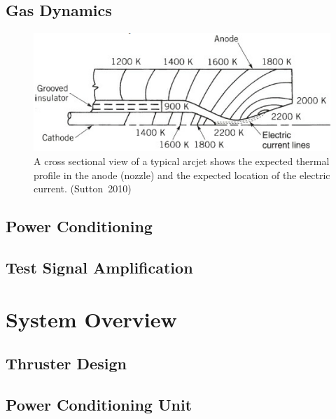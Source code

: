 \documentclass[journal]{IEEEtran}
\begin{document}
\subsection{Gas Dynamics}

\begin{figure}[hbp]
  \centering
  \includegraphics[width=\linewidth]{img/cross-section_sutton}
  \caption[Arcjet cross-section]{A cross sectional view of a typical arcjet shows the expected thermal profile in the anode (nozzle) and the expected location of the electric current. (Sutton~2010)
\label{fig:x-section-sutton}}
\end{figure}

\subsection{Power Conditioning}

\subsection{Test Signal Amplification}

\section{System Overview}

\subsection{Thruster Design}

\subsection{Power Conditioning Unit}
\end{document}
